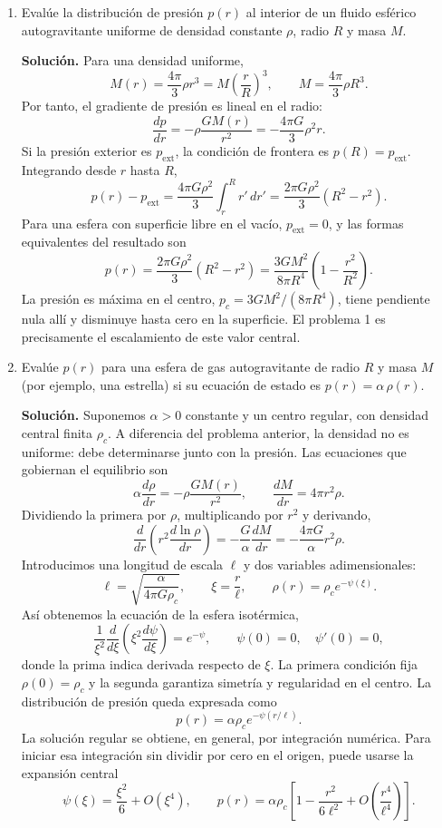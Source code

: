 \begin{enumerate}
\item Evalúe la distribución de presión $p(r)$ al interior de un fluido esférico autogravitante uniforme de densidad constante $\rho$, radio $R$ y masa $M$.

\textbf{Solución.} Para una densidad uniforme,
$$
M(r)=\frac{4\pi}{3}\rho r^3
=M\left(\frac{r}{R}\right)^3,
\qquad M=\frac{4\pi}{3}\rho R^3.
$$
Por tanto, el gradiente de presión es lineal en el radio:
$$
\frac{dp}{dr}=-\rho\frac{GM(r)}{r^2}
=-\frac{4\pi G}{3}\rho^2r.
$$
Si la presión exterior es $p_{\mathrm{ext}}$, la condición de frontera es $p(R)=p_{\mathrm{ext}}$. Integrando desde $r$ hasta $R$,
$$
p(r)-p_{\mathrm{ext}}
=\frac{4\pi G\rho^2}{3}\int_r^R r'\,dr'
=\frac{2\pi G\rho^2}{3}(R^2-r^2).
$$
Para una esfera con superficie libre en el vacío, $p_{\mathrm{ext}}=0$, y las formas equivalentes del resultado son
$$
\boxed{
p(r)=\frac{2\pi G\rho^2}{3}(R^2-r^2)
=\frac{3GM^2}{8\pi R^4}\left(1-\frac{r^2}{R^2}\right)
}.
$$
La presión es máxima en el centro, $p_c=3GM^2/(8\pi R^4)$, tiene pendiente nula allí y disminuye hasta cero en la superficie. El problema 1 es precisamente el escalamiento de este valor central.

\item Evalúe $p(r)$ para una esfera de gas autogravitante de radio $R$ y masa $M$ (por ejemplo, una estrella) si su ecuación de estado es $p(r) = \alpha\,\rho(r)$.

\textbf{Solución.} Suponemos $\alpha>0$ constante y un centro regular, con densidad central finita $\rho_c$. A diferencia del problema anterior, la densidad no es uniforme: debe determinarse junto con la presión. Las ecuaciones que gobiernan el equilibrio son
$$
\alpha\frac{d\rho}{dr}=-\rho\frac{GM(r)}{r^2},
\qquad \frac{dM}{dr}=4\pi r^2\rho.
$$
Dividiendo la primera por $\rho$, multiplicando por $r^2$ y derivando,
$$
\frac{d}{dr}\left(r^2\frac{d\ln\rho}{dr}\right)
=-\frac{G}{\alpha}\frac{dM}{dr}
=-\frac{4\pi G}{\alpha}r^2\rho.
$$
Introducimos una longitud de escala $\ell$ y dos variables adimensionales:
$$
\ell=\sqrt{\frac{\alpha}{4\pi G\rho_c}},
\qquad \xi=\frac{r}{\ell},
\qquad \rho(r)=\rho_c e^{-\psi(\xi)}.
$$
Así obtenemos la ecuación de la esfera isotérmica,
$$
\boxed{
\frac{1}{\xi^2}\frac{d}{d\xi}
\left(\xi^2\frac{d\psi}{d\xi}\right)=e^{-\psi}
},\qquad \psi(0)=0,\quad \psi'(0)=0,
$$
donde la prima indica derivada respecto de $\xi$. La primera condición fija $\rho(0)=\rho_c$ y la segunda garantiza simetría y regularidad en el centro. La distribución de presión queda expresada como
$$
\boxed{p(r)=\alpha\rho_c e^{-\psi(r/\ell)}}.
$$
La solución regular se obtiene, en general, por integración numérica. Para iniciar esa integración sin dividir por cero en el origen, puede usarse la expansión central
$$
\psi(\xi)=\frac{\xi^2}{6}+O(\xi^4),
\qquad
p(r)=\alpha\rho_c\left[1-\frac{r^2}{6\ell^2}
+O\!\left(\frac{r^4}{\ell^4}\right)\right].
$$


\end{enumerate}
